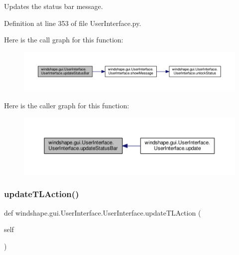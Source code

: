 \begin{DoxyVerb}Updates the status bar message.\end{DoxyVerb}
 

Definition at line 353 of file User\+Interface.\+py.

Here is the call graph for this function\+:\nopagebreak
\begin{figure}[H]
\begin{center}
\leavevmode
\includegraphics[width=350pt]{classwindshape_1_1gui_1_1_user_interface_1_1_user_interface_a8b50a6746f4bfc24923999b5022896c8_cgraph}
\end{center}
\end{figure}
Here is the caller graph for this function\+:\nopagebreak
\begin{figure}[H]
\begin{center}
\leavevmode
\includegraphics[width=350pt]{classwindshape_1_1gui_1_1_user_interface_1_1_user_interface_a8b50a6746f4bfc24923999b5022896c8_icgraph}
\end{center}
\end{figure}
\mbox{\label{classwindshape_1_1gui_1_1_user_interface_1_1_user_interface_a26806922c4bfbbbbbffe85dfcf85e614}} 
\subsubsection{\texorpdfstring{update\+T\+L\+Action()}{updateTLAction()}}
{\footnotesize\ttfamily def windshape.\+gui.\+User\+Interface.\+User\+Interface.\+update\+T\+L\+Action (\begin{DoxyParamCaption}\item[{}]{self }\end{DoxyParamCaption})}

